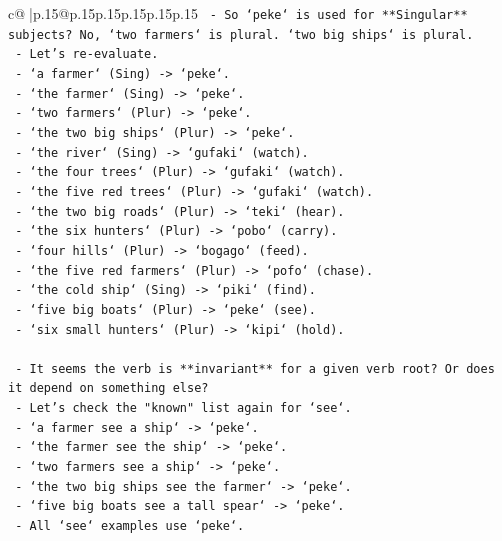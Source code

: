 \documentclass{article}
\begin{document}
{\begin{supertabular}{c@{$\;$}|p{.15\linewidth}@{}p{.15\linewidth}p{.15\linewidth}p{.15\linewidth}p{.15\linewidth}p{.15\linewidth}}
{{{\texttt{     {-} So `peke` is used for **Singular** subjects? No, `two farmers` is plural. `two big ships` is plural.} \\
\texttt{     {-} Let's re{-}evaluate.} \\
\texttt{     {-} `a farmer` (Sing) {-}> `peke`.} \\
\texttt{     {-} `the farmer` (Sing) {-}> `peke`.} \\
\texttt{     {-} `two farmers` (Plur) {-}> `peke`.} \\
\texttt{     {-} `the two big ships` (Plur) {-}> `peke`.} \\
\texttt{     {-} `the river` (Sing) {-}> `gufaki` (watch).} \\
\texttt{     {-} `the four trees` (Plur) {-}> `gufaki` (watch).} \\
\texttt{     {-} `the five red trees` (Plur) {-}> `gufaki` (watch).} \\
\texttt{     {-} `the two big roads` (Plur) {-}> `teki` (hear).} \\
\texttt{     {-} `the six hunters` (Plur) {-}> `pobo` (carry).} \\
\texttt{     {-} `four hills` (Plur) {-}> `bogago` (feed).} \\
\texttt{     {-} `the five red farmers` (Plur) {-}> `pofo` (chase).} \\
\texttt{     {-} `the cold ship` (Sing) {-}> `piki` (find).} \\
\texttt{     {-} `five big boats` (Plur) {-}> `peke` (see).} \\
\texttt{     {-} `six small hunters` (Plur) {-}> `kipi` (hold).} \\
\\ 
\texttt{   {-} It seems the verb is **invariant** for a given verb root? Or does it depend on something else?} \\
\texttt{   {-} Let's check the "known" list again for `see`.} \\
\texttt{     {-} `a farmer see a ship` {-}> `peke`.} \\
\texttt{     {-} `the farmer see the ship` {-}> `peke`.} \\
\texttt{     {-} `two farmers see a ship` {-}> `peke`.} \\
\texttt{     {-} `the two big ships see the farmer` {-}> `peke`.} \\
\texttt{     {-} `five big boats see a tall spear` {-}> `peke`.} \\
\texttt{   {-} All `see` examples use `peke`.} \\
}}}
\end{supertabular}}
\end{document}

